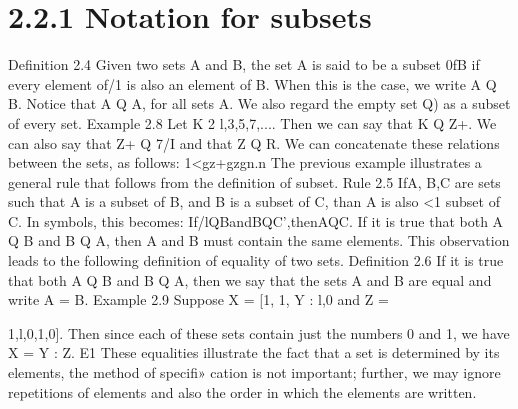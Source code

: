 {{\smallskip 
\section{2.2.1 Notation for subsets}
\smallskip 
Deﬁnition 2.4 Given two sets A and B, the set A is said to be a subset 0fB if every element
of/1 is also an element of B. When this is the case, we write A Q B.
Notice that A Q A, for all sets A. We also regard the empty set Q) as a subset of every set.
\smallskip 
\smallskip 
Example 2.8 Let K 2 {l,3,5,7,...}. Then we can say that K Q Z+. We can also say that
Z+ Q 7/I and that Z Q R.
We can concatenate these relations between the sets, as follows:
1<gz+gzgn.n
\smallskip 
\smallskip 
The previous example illustrates a general rule that follows from the deﬁnition of subset.
Rule 2.5 IfA, B,C are sets such that A is a subset of B, and B is a subset of C, than A is also
<1 subset of C. In symbols, this becomes:
If/lQBandBQC’,thenAQC.
\smallskip 
\smallskip 
If it is true that both A Q B and B Q A, then A and B must contain the same elements. This
observation leads to the following deﬁnition of equality of two sets.
Deﬁnition 2.6 If it is true that both A Q B and B Q A, then we say that the sets A and B are
equal and write A = B.
\smallskip 
\smallskip 
Example 2.9 Suppose X = {[1, 1}, Y : {l,0} and Z = {1,l,0,1,0]. Then since each of these
sets contain just the numbers 0 and 1, we have X = Y : Z. E1
These equalities illustrate the fact that a set is determined by its elements, the method of speciﬁ»
cation is not important; further, we may ignore repetitions of elements and also the order in which
the elements are written.
\smallskip 
\smallskip 


}}}
